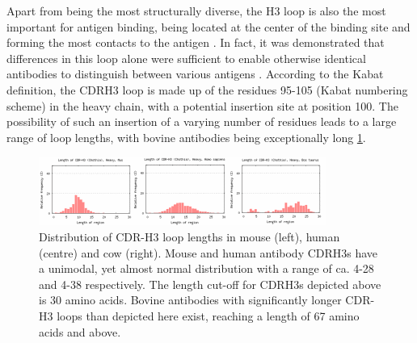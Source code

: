 \documentclass[preprint,12pt]{elsarticle}
\begin{document}
Apart from being the most structurally diverse, the H3 loop is also the most important for antigen binding, being located at the center of the binding site and forming the most contacts to the antigen \cite{MacCallum1996}. In fact, it was demonstrated that differences in this loop alone were sufficient to enable otherwise identical antibodies to distinguish between various antigens \cite{Xu2000}. 
 According to the Kabat definition, the CDRH3 loop is made up of the residues 95-105 (Kabat numbering scheme\cite{Kabat1992}) in the heavy chain, with a potential insertion site at position 100. The possibility of such an insertion of a varying number of residues leads to a large range of loop lengths, with bovine antibodies being exceptionally long \ref{fig:loopdist}.
\begin{figure}[h!]
  \includegraphics[scale=1]{loopdist.png}
  \centering
  \caption { Distribution of CDR-H3 loop lengths in mouse (left), human (centre) and cow (right). Mouse and human antibody CDRH3s have a unimodal, yet almost normal distribution with a range of ca. 4-28 and 4-38 respectively. The length cut-off for CDRH3s depicted above is 30 amino acids. Bovine antibodies with significantly longer CDR-H3 loops than depicted here exist, reaching a length of 67 amino acids and above. \cite{Wong2015}}
  \label{fig:loopdist}
\end{figure}
\end{document}
